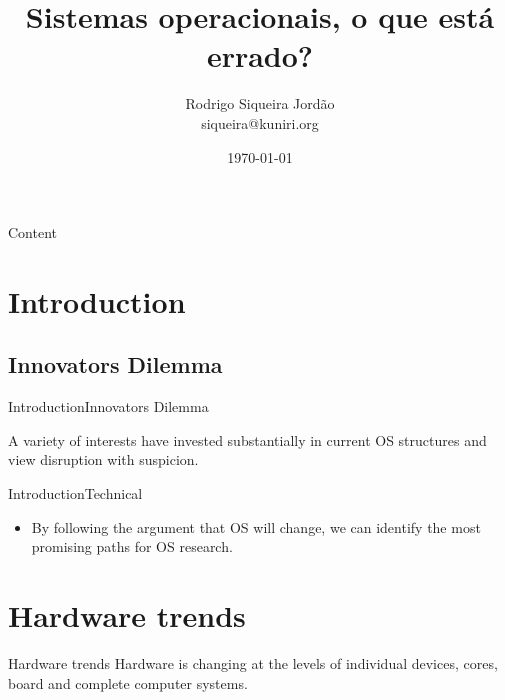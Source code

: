 \documentclass[10pt]{beamer}
\title[] %
{ %
      \textbf{Sistemas operacionais, o que está errado?}
}
\subtitle[Sistemas operacionais, o que está errado?]
{
}
\author[Rodrigo Siqueira Jordão]
{      Rodrigo Siqueira Jordão\\
      {\ttfamily siqueira@kuniri.org}
}
\institute[]
{
      Instituto de Matemática e Estatística\\
      Univerversidade de São Paulo\\
  
}
\date{\today}
\begin{document}

{\1%
\begin{frame} 
  \titlepage %
\end{frame}}

\begin{frame}{Content}{}
  \tableofcontents
\end{frame}

\section{Introduction}
\subsection{Innovators Dilemma}
\begin{frame}{Introduction}{Innovators Dilemma}
  \begin{block}{}
  A variety of interests have invested substantially in current OS structures
  and view disruption with suspicion.
  \end{block}
\end{frame}

\begin{frame}{Introduction}{Technical}
  \begin{itemize}
    \item By following the argument that OS will change, we can identify the
          most promising paths for OS research.
  \end{itemize}
\end{frame}

\section{Hardware trends}
\begin{frame}{Hardware trends}
  Hardware is changing at the levels of individual devices, cores, board and
  complete computer systems.
\end{frame}
\end{document}
